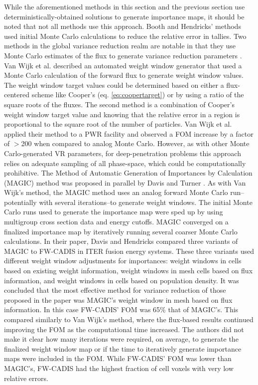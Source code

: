 While the aforementioned methods in this section and the previous section use
deterministically-obtained solutions to generate importance maps, it should be
noted that not all methods use this approach. Booth and Hendricks' methods used
initial Monte Carlo calculations to reduce the relative error in tallies. Two
methods in the global variance reduction realm are notable in that they use
Monte Carlo estimates of the flux to generate variance reduction parameters
\cite{van_wijk_easy_2011, davis_comparison_2011}.
Van Wijk et al. \cite{van_wijk_easy_2011} described an automated weight
window generator that used a Monte
Carlo calculation of the forward flux to generate weight window values. The
weight window target values could be determined based on either a flux-centered
scheme like Cooper's (eq. \eqref{eq:coopertarget})
or by using a ratio of the square roots of the fluxes. The
second method is a combination of Cooper's weight window target value and
knowing that the relative error in a region
is proportional to the square root of the number
of particles.
Van Wijk et al. applied their method to a PWR facility and observed a FOM
increase by a factor of $>$200 when compared to analog Monte Carlo. However, as
with other Monte Carlo-generated VR parameters, for deep-penetration problems
this approach relies on adequate sampling of all phase-space, which could be
computationally prohibitive.
The Method of Automatic Generation of Importances by Calculation (MAGIC) method
was proposed in parallel by Davis and Turner \cite{davis_comparison_2011}.
As with Van Wijk's method, the MAGIC method uses an analog forward Monte Carlo
run--potentially with several iterations--to generate weight windows. The initial
Monte Carlo runs used to generate the importance map were sped up by
using multigroup cross section data and energy cutoffs. MAGIC
converged on a finalized importance map by iteratively running several coarser
Monte Carlo calculations.
In their paper, Davis and Hendricks compared three variants of MAGIC
to FW-CADIS in ITER fusion energy systems.
These three variants used different weight window adjustments for importances:
weight windows in cells based on existing weight information, weight windows in
mesh cells based on flux information, and weight windows in cells based on
population density.
It was concluded that the most effective method for variance
reduction of those proposed in the paper
was MAGIC's weight window in mesh based on flux
information. In this case FW-CADIS' FOM was 65\% that of MAGIC's. This compared
similarly to Van Wijk's method, where the flux-based results continued improving
the FOM as the computational time increased.
The authors did not make it clear how many iterations were required, on average,
to generate the finalized weight window map or if the time to iteratively
generate importance maps were included in the FOM. While FW-CADIS' FOM was lower
than MAGIC's, FW-CADIS had the highest fraction of cell voxels with very low
relative errors.

